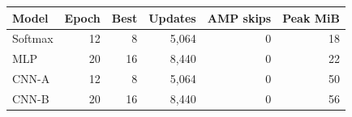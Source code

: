 \begin{tabular}{lrrrrr}
\toprule
Model & Epoch & Best & Updates & AMP skips & Peak MiB\\
\midrule
Softmax & 12 & 8 & 5,064 & 0 & 18\\
MLP & 20 & 16 & 8,440 & 0 & 22\\
CNN-A & 12 & 8 & 5,064 & 0 & 50\\
CNN-B & 20 & 16 & 8,440 & 0 & 56\\
\bottomrule
\end{tabular}
